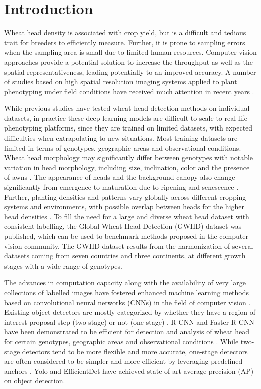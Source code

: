 \documentclass[utf8]{frontiersSCNS} %
\begin{document}
\section{Introduction} 
\par
Wheat head density is associated with crop yield, but is a difficult and tedious trait for breeders to efficiently measure. Further, it is prone to sampling errors when the sampling area is small due to limited human resources. Computer vision approaches provide a potential solution to increase the throughput as well as the spatial representativeness, leading potentially to an improved accuracy. A number of studies based on high spatial resolution imaging systems applied to plant phenotyping under field conditions have received much attention in recent years \citep{li2014review}.
\par
While previous studies \citep{milioto2018real, ubbens2018use, madec2019ear} have tested wheat head detection methods on individual datasets, in practice these deep learning models are difficult to scale to real-life phenotyping platforms, since they are trained on limited datasets, with expected difficulties when extrapolating to new situations. Most training datasets are limited in terms of genotypes, geographic areas and observational conditions. Wheat head morphology may significantly differ between genotypes with notable variation in head morphology, including size, inclination, color and the presence of awns \citep{david2020global}. The appearance of heads and the background canopy also change significantly from emergence to maturation due to ripening and senescence \citep{anderegg2020spectral}. Further, planting densities and patterns vary globally across different cropping systems and environments, with possible overlap between heads for the higher head densities \citep{david2020global}. To fill the need for a large and diverse wheat head dataset with consistent labelling, the Global Wheat Head Detection (GWHD) dataset \citep{david2020global} was published, which can be used to benchmark methods proposed in the computer vision community. The GWHD dataset results from the harmonization of several datasets coming from seven countries and three continents, at different growth stages with a wide range of genotypes.
\par
The advances in computation capacity along with the availability of very large collections of labelled images have fostered enhanced machine learning methods based on convolutional neural networks (CNNs) in the field of computer vision \citep{lecun2015deep}. Existing object detectors are mostly categorized by whether they have a region-of interest proposal step (two-stage) \citep{girshick2014rich, ren2015faster} or not (one-stage) \citep{tan2020efficientdet, bochkovskiy2020yolov4}. R-CNN  and Faster R-CNN have been demonstrated to be efficient for detection and analysis of wheat head for certain genotypes, geographic areas and observational conditions \citep{hasan2018detection, madec2019ear}.  While two-stage detectors tend to be more flexible and more accurate, one-stage detectors are often considered to be simpler and more efficient by leveraging predefined anchors \citep{huang2017speed}. Yolo and EfficientDet have achieved state-of-art average precision (AP) on object detection.
\end{document}
